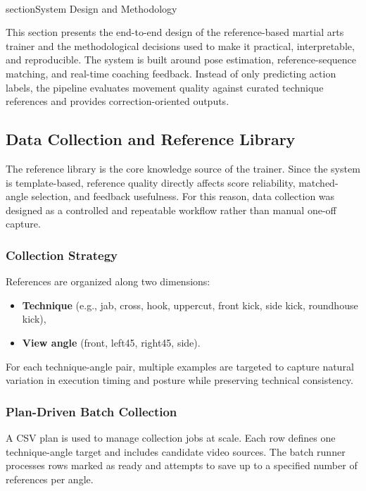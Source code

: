 \documentclass[12pt]{article}
\begin{document}
{\\section{System Design and Methodology}

This section presents the end-to-end design of the reference-based martial arts trainer and the methodological decisions used to make it practical, interpretable, and reproducible. The system is built around pose estimation, reference-sequence matching, and real-time coaching feedback. Instead of only predicting action labels, the pipeline evaluates movement quality against curated technique references and provides correction-oriented outputs.

\subsection{Data Collection and Reference Library}

The reference library is the core knowledge source of the trainer. Since the system is template-based, reference quality directly affects score reliability, matched-angle selection, and feedback usefulness. For this reason, data collection was designed as a controlled and repeatable workflow rather than manual one-off capture.

\subsubsection{Collection Strategy}

References are organized along two dimensions:

\begin{itemize}
    \item \textbf{Technique} (e.g., jab, cross, hook, uppercut, front kick, side kick, roundhouse kick),
    \item \textbf{View angle} (front, left45, right45, side).
\end{itemize}

For each technique-angle pair, multiple examples are targeted to capture natural variation in execution timing and posture while preserving technical consistency.

\subsubsection{Plan-Driven Batch Collection}

A CSV plan is used to manage collection jobs at scale. Each row defines one technique-angle target and includes candidate video sources. The batch runner processes rows marked as ready and attempts to save up to a specified number of references per angle.

}
\end{document}
